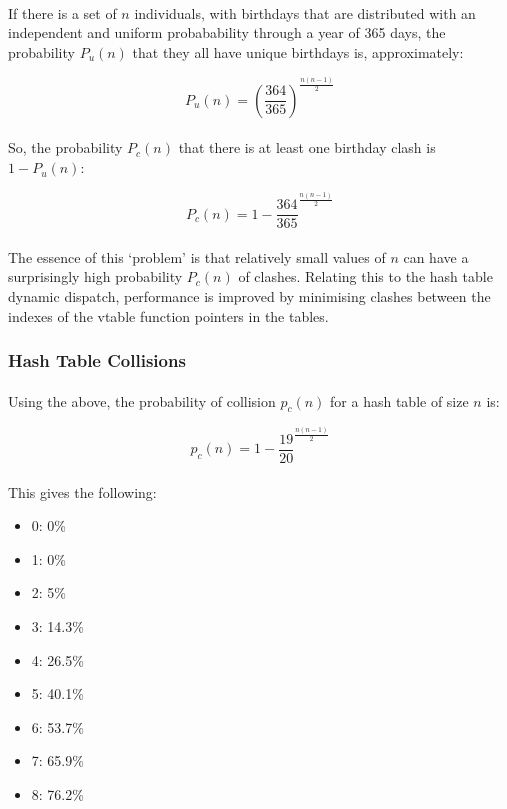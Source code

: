 \documentclass[12pt,twoside,notitlepage]{report}
\begin{document}
\paragraph{}
If there is a set of $n$ individuals, with birthdays that are distributed with an independent and uniform probabability through a year of 365 days, the probability $P_{u}(n)$ that they all have unique birthdays is, approximately:

$$P_{u}(n) = (\frac{364}{365})^{\frac{n(n - 1)}{2}}$$

\paragraph{}
So, the probability $P_{c}(n)$ that there is at least one birthday clash is $1 - P_{u}(n)$:

$$P_{c}(n) = 1 - \frac{364}{365}^{\frac{n(n - 1)}{2}}$$

\paragraph{}
The essence of this `problem' is that relatively small values of $n$ can have a surprisingly high probability $P_{c}(n)$ of clashes. Relating this to the hash table dynamic dispatch, performance is improved by minimising clashes between the indexes of the vtable function pointers in the tables.

\subsubsection{Hash Table Collisions}

\paragraph{}
Using the above, the probability of collision $p_{c}(n)$ for a hash table of size $n$ is:

$$p_{c}(n) = 1 - \frac{19}{20}^\frac{n(n − 1)}{2}$$

\paragraph{}
This gives the following:

\begin{itemize}
\item 0: 0\%
\item 1: 0\%
\item 2: 5\%
\item 3: 14.3\%
\item 4: 26.5\%
\item 5: 40.1\%
\item 6: 53.7\%
\item 7: 65.9\%
\item 8: 76.2\%
\end{itemize}
\end{document}
